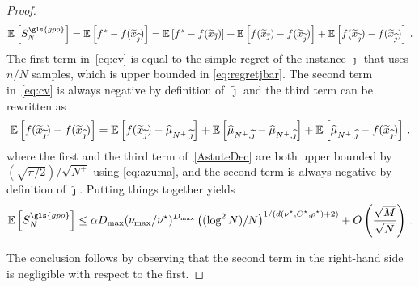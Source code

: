\begin{proof}
\begin{equation}\label{eq:cv}
    \EE{S_N^{\gls{gpo}}} = \EE{f^\star - f(\tilde{x}_{\hat\jmath})} = \EE{f^\star - f(\tilde{x}_{\bar{\jmath}})} + \EE{f(\tilde{x}_{\bar{\jmath}}) - f(\tilde{x}_{\tilde{\jmath}})} + \EE{f(\tilde{x}_{\tilde{\jmath}}) - f(\tilde{x}_{\hat{\jmath}})}\,.
\end{equation}
The first term in~\eqref{eq:cv} is equal to the simple regret of the instance $\overline{\jmath}$ that uses $n/N$ samples, which is upper bounded in \eqref{eq:regretjbar}. The second term in~\eqref{eq:cv} is always negative by definition of~$\tilde{\jmath}$ and the third term can be rewritten as
\begin{equation}\label{AstuteDec}
    \mathbb{E}\left[f(\widetilde{x}_{\widetilde{\jmath}}) - f(\widetilde{x}_{\widehat{\jmath}})\right] = \mathbb{E}\left[f(\widetilde{x}_{\widetilde{\jmath}}) - \widehat{\mu}_{N^+,\widetilde{\jmath}}\right] + \mathbb{E}\left[\widehat{\mu}_{N^+,\widetilde{\jmath}} - \widehat{\mu}_{N^+,\widehat{\jmath}}\right] + \mathbb{E}\left[\widehat{\mu}_{N^+,\widehat{\jmath}} - f(\widetilde{x}_{\widehat{\jmath}})\right]\,.
\end{equation}
where the first and the third term of~\eqref{AstuteDec} are both upper bounded by $(\sqrt{\pi/2})/\sqrt{N^+}$ using \eqref{eq:azuma}, and the second term is always negative by definition of $\hat{\jmath}$.
Putting things together yields 
\[    
    \EE{S_N^{\gls{gpo}}}  \leq \alpha D_{\max}(\nu_{\max}/\nu^\star)^{D_{\max}} \left( (\log^2 N)/N\right)^{1/(d(\nu^\star, C^\star,\rho^\star)+2)}+ O\left(\frac{\sqrt{M}}{\sqrt{N}}\right)\,.
\]

The conclusion follows by observing that the second term in the right-hand side is negligible with respect to the first. 
\end{proof}
